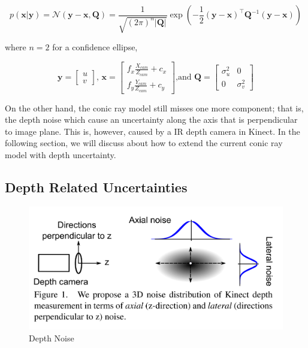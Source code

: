 \documentclass[a4paper]{report}
\numberwithin{figure}{section}
\begin{document}
\begin{equation}
  p(\mathbf{x}|\mathbf{y}) = \mathcal{N}(\mathbf{y}-\mathbf{x, \mathbf{Q}}) = 
  \frac{1}{\sqrt{(2\pi)^n|\mathbf{Q}|}} 
  \exp(-\frac{1}{2} (\mathbf{y}-\mathbf{x})^\intercal \mathbf{Q}^{-1} (\mathbf{y}-\mathbf{x}))
\end{equation}

where $n=2$ for a confidence ellipse,

\begin{equation}
  \mathbf{y} = \begin{bmatrix}u \\ v \end{bmatrix} \text{, } 
  \mathbf{x} = \begin{bmatrix} f_x \frac{X_{cam}}{Z_{cam}} + c_x \\ f_y \frac{Y_{cam}}{Z_{cam}} + c_y \end{bmatrix} \text{,and }
  \mathbf{Q} = \begin{bmatrix} \sigma_u^2 & 0 \\ 0 & \sigma_v^2 \end{bmatrix}
\end{equation}

On the other hand, the conic ray model still misses one more component; 
that is, the depth noise which cause an uncertainty 
along the axis that is perpendicular to image plane. 
This is, however, caused by a IR depth camera in Kinect. 
In the following section, we will discuss about how to extend the current conic ray 
model with depth uncertainty.

\subsection{Depth Related Uncertainties} \label{sb_sc_depth_uncertainty}

\begin{figure}[H]
	\centering
  \includegraphics[width=0.7\linewidth,natwidth=640,natheight=640]
  {fig/ref_imgs/kinect_noise_model.png}
  \caption{Depth Noise}
	\label{fig:depth_noise}
\end{figure}
\end{document}
